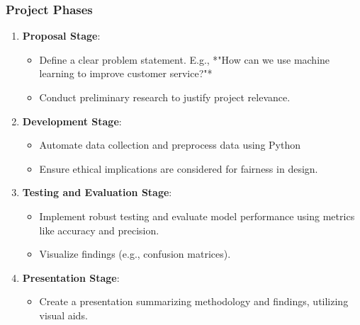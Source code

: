 \documentclass[aspectratio=169]{beamer}
\begin{document}
\begin{frame}[fragile]
    \frametitle{Project Phases}
    \begin{enumerate}
        \item \textbf{Proposal Stage}:
        \begin{itemize}
            \item Define a clear problem statement. E.g., *"How can we use machine learning to improve customer service?"*
            \item Conduct preliminary research to justify project relevance.
        \end{itemize}
        
        \item \textbf{Development Stage}:
        \begin{itemize}
            \item Automate data collection and preprocess data using Python
            \item Ensure ethical implications are considered for fairness in design.
        \end{itemize}
        
        \item \textbf{Testing and Evaluation Stage}:
        \begin{itemize}
            \item Implement robust testing and evaluate model performance using metrics like accuracy and precision.
            \item Visualize findings (e.g., confusion matrices).
        \end{itemize}
        
        \item \textbf{Presentation Stage}:
        \begin{itemize}
            \item Create a presentation summarizing methodology and findings, utilizing visual aids.
        \end{itemize}
    \end{enumerate}
\end{frame}
\end{document}
